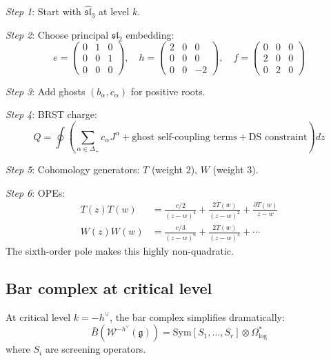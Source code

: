 \begin{example}[\texorpdfstring{$\mathcal{W}_3$}{W3} algebra for \texorpdfstring{$\mathfrak{g} = \mathfrak{sl}_3$}{g = sl3}]
\emph{Step 1}: Start with $\hat{\mathfrak{sl}}_3$ at level $k$.

\emph{Step 2}: Choose principal $\mathfrak{sl}_2$ embedding:
\[
e = \begin{pmatrix} 0 & 1 & 0 \\ 0 & 0 & 1 \\ 0 & 0 & 0 \end{pmatrix}, \quad
h = \begin{pmatrix} 2 & 0 & 0 \\ 0 & 0 & 0 \\ 0 & 0 & -2 \end{pmatrix}, \quad
f = \begin{pmatrix} 0 & 0 & 0 \\ 2 & 0 & 0 \\ 0 & 2 & 0 \end{pmatrix}
\]

\emph{Step 3}: Add ghosts $(b_\alpha, c_\alpha)$ for positive roots.

\emph{Step 4}: BRST charge:
\[
Q = \oint \left( \sum_{\alpha \in \Delta_+} c_\alpha J^\alpha + \text{ghost self-coupling terms} + \text{DS constraint} \right) dz
\]

\emph{Step 5}: Cohomology generators: $T$ (weight 2), $W$ (weight 3).

\emph{Step 6}: OPEs:
\begin{align}
T(z)T(w) &= \frac{c/2}{(z-w)^4} + \frac{2T(w)}{(z-w)^2} + \frac{\partial T(w)}{z-w} \\
W(z)W(w) &= \frac{c/3}{(z-w)^6} + \frac{2T(w)}{(z-w)^4} + \cdots
\end{align}
The sixth-order pole makes this highly non-quadratic.
\end{example}

\subsection{Bar complex at critical level}

\begin{theorem}
\label{thm:feigin-frenkel-bar}
At critical level $k = -h^{\vee}$, the bar complex simplifies dramatically:
\[
\bar{B}(\mathcal{W}^{-h^{\vee}}(\mathfrak{g})) = \text{Sym}[S_1, \ldots, S_r] \otimes \Omega^*_{\log}
\]
where $S_i$ are screening operators.
\end{theorem}

